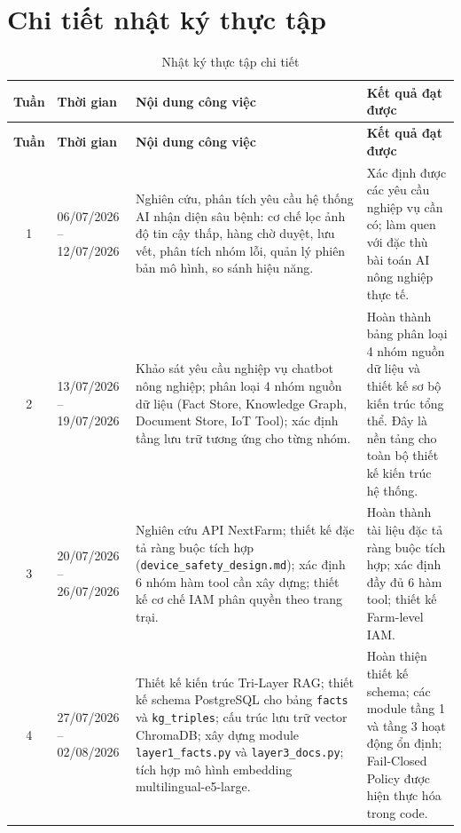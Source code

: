 \section{Chi tiết nhật ký thực tập}

\begin{longtable}{|c|p{3.0cm}|p{5.5cm}|p{4.5cm}|}
\caption{Nhật ký thực tập chi tiết}
\label{tab:nhat-ky-thuc-tap} \\
\hline
\textbf{Tuần} & \textbf{Thời gian} & \textbf{Nội dung công việc} & \textbf{Kết quả đạt được} \\
\hline
\endfirsthead

\hline
\textbf{Tuần} & \textbf{Thời gian} & \textbf{Nội dung công việc} & \textbf{Kết quả đạt được} \\
\hline
\endhead

1 & 06/07/2026 -- 12/07/2026
& Nghiên cứu, phân tích yêu cầu hệ thống AI nhận diện sâu bệnh: cơ chế lọc ảnh độ tin cậy thấp, hàng chờ duyệt, lưu vết, phân tích nhóm lỗi, quản lý phiên bản mô hình, so sánh hiệu năng.
& Xác định được các yêu cầu nghiệp vụ cần có; làm quen với đặc thù bài toán AI nông nghiệp thực tế. \\
\hline

2 & 13/07/2026 -- 19/07/2026
& Khảo sát yêu cầu nghiệp vụ chatbot nông nghiệp; phân loại 4 nhóm nguồn dữ liệu (Fact Store, Knowledge Graph, Document Store, IoT Tool); xác định tầng lưu trữ tương ứng cho từng nhóm.
& Hoàn thành bảng phân loại 4 nhóm nguồn dữ liệu và thiết kế sơ bộ kiến trúc tổng thể. Đây là nền tảng cho toàn bộ thiết kế kiến trúc hệ thống. \\
\hline

3 & 20/07/2026 -- 26/07/2026
& Nghiên cứu API NextFarm; thiết kế đặc tả ràng buộc tích hợp (\texttt{device\_safety\_design.md}); xác định 6 nhóm hàm tool cần xây dựng; thiết kế cơ chế IAM phân quyền theo trang trại.
& Hoàn thành tài liệu đặc tả ràng buộc tích hợp; xác định đầy đủ 6 hàm tool; thiết kế Farm-level IAM. \\
\hline

4 & 27/07/2026 -- 02/08/2026
& Thiết kế kiến trúc Tri-Layer RAG; thiết kế schema PostgreSQL cho bảng \texttt{facts} và \texttt{kg\_triples}; cấu trúc lưu trữ vector ChromaDB; xây dựng module \texttt{layer1\_facts.py} và \texttt{layer3\_docs.py}; tích hợp mô hình embedding multilingual-e5-large.
& Hoàn thiện thiết kế schema; các module tầng 1 và tầng 3 hoạt động ổn định; Fail-Closed Policy được hiện thực hóa trong code. \\
\hline


\end{longtable}
